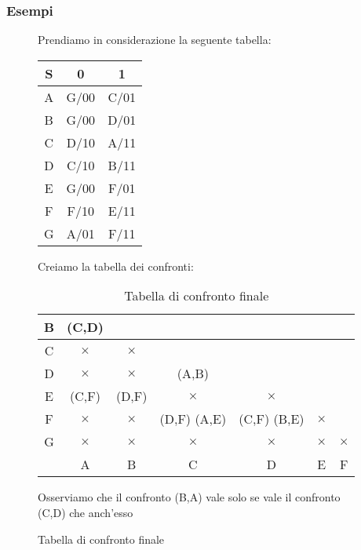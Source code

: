 \documentclass[a4paper]{article}
\theoremstyle{break}
\theoremstyle{break}
\theoremstyle{break}
\theoremstyle{break}
\begin{document}
\subsubsection{Esempi}
\begin{figure}[H]
  \begin{example}
    Prendiamo in considerazione la seguente tabella:
    \begin{table}[H]
      \begin{center}
        \begin{tabular}{c|c|c}
          S & 0 & 1 \\
          \hline
          A & G/00 & C/01 \\
          B & G/00 & D/01 \\
          C & D/10 & A/11 \\
          D & C/10 & B/11 \\
          E & G/00 & F/01 \\
          F & F/10 & E/11 \\
          G & A/01 & F/11 \\
        \end{tabular}
      \end{center}
    \end{table}
    Creiamo la tabella dei confronti:
    \begin{table}[H]
  \begin{center}
    \begin{tabular}{c|c|c|c|c|c|c}
      B & (C,D) &  &  &  &  & \\
      \hline
      C & \( \times  \)  & \( \times \)  &  &  &  &  \\
      \hline
      D & \( \times  \)  & \( \times  \)  & (A,B) &  &  &  \\
      \hline
      E & (C,F) & (D,F) & \( \times \)  & \( \times  \) &  &   \\
      \hline
      F & \( \times  \)  & \( \times  \)  & (D,F) (A,E)  & (C,F) (B,E) & \( \times  \)  & \\
      \hline
      G & \( \times  \)  & \( \times  \)  & \( \times  \)  & \( \times  \) & \( \times  \)  & \( \times  \)  \\
      \hline
        & A & B & C & D & E & F \\
    \end{tabular}
  \end{center}
  \caption{Tabella di confronto finale}
\end{table}
    Osserviamo che il confronto (B,A) vale solo se vale il confronto (C,D) che anch'esso

\end{example}
\end{figure}
\end{document}
